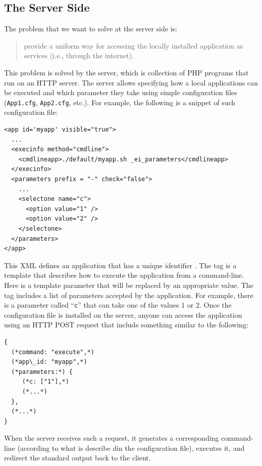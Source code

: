 \subsection{The Server Side}
\label{ch:overview:arch:server}

The problem that we want to solve at the server side is: 
%
\begin{quote}
  provide a uniform way for accessing the locally installed
  application as services (i.e., through the internet).
\end{quote}
%
This problem is solved by the \ei server, which is collection of PHP
programs that run on an HTTP server. The \ei server allows specifying
how a local applications can be executed and which parameter they take
using simple configuration files (\texttt{App1.cfg},
\texttt{App2.cfg}, etc.). For example, the following is a snippet of
such configuration file:

\medskip
\begin{lstlisting}
<app id='myapp' visible="true">
  ...
  <execinfo method="cmdline">
    <cmdlineapp>./default/myapp.sh _ei_parameters</cmdlineapp>
  </execinfo>
  <parameters prefix = "-" check="false">
    ...
    <selectone name="c">
      <option value="1" />
      <option value="2" />
    </selectone>
  </parameters>
</app>
\end{lstlisting}

\medskip
\noindent
This XML defines an application that has a unique identifier
.  The  tag is a template that describes
how to execute the application from a command-line. Here
 is a template parameter that will be replaced by
an appropriate value. The  tag includes a list of
parameters accepted by the application. For example, there is a
parameter called ``\texttt{c}'' that can take one of the values $1$ or
$2$.
%
Once the configuration file is installed on the \ei server, anyone can
access the application using an HTTP POST request that include
something similar to the following:

\medskip
\begin{lstlisting}
{
  (*command: "execute",*)
  (*app\_id: "myapp",*)
  (*parameters:*) {
     (*c: ["1"],*)
     (*...*)
  },
  (*...*)
}
\end{lstlisting} 

\medskip
\noindent
When the \ei server receives such a request, it generates a
corresponding command-line (according to what is describe din the
configuration file), executes it, and redirect the standard output
back to the client.

